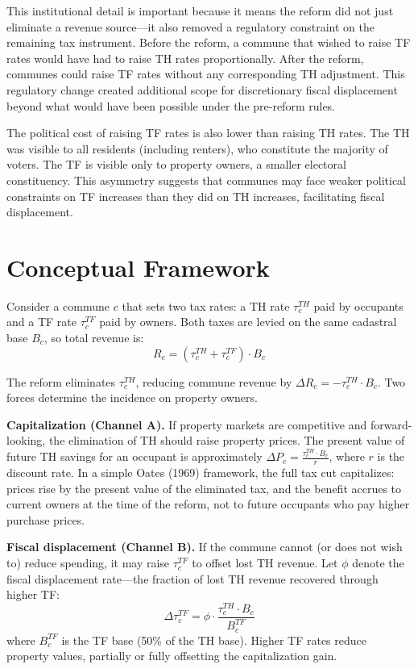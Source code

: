 \documentclass[12pt]{article}
\begin{document}
This institutional detail is important because it means the reform did not just eliminate a revenue source---it also removed a regulatory constraint on the remaining tax instrument. Before the reform, a commune that wished to raise TF rates would have had to raise TH rates proportionally. After the reform, communes could raise TF rates without any corresponding TH adjustment. This regulatory change created additional scope for discretionary fiscal displacement beyond what would have been possible under the pre-reform rules.

The political cost of raising TF rates is also lower than raising TH rates. The TH was visible to all residents (including renters), who constitute the majority of voters. The TF is visible only to property owners, a smaller electoral constituency. This asymmetry suggests that communes may face weaker political constraints on TF increases than they did on TH increases, facilitating fiscal displacement.


\section{Conceptual Framework}

Consider a commune $c$ that sets two tax rates: a TH rate $\tau^{TH}_c$ paid by occupants and a TF rate $\tau^{TF}_c$ paid by owners. Both taxes are levied on the same cadastral base $B_c$, so total revenue is:
\begin{equation}
R_c = (\tau^{TH}_c + \tau^{TF}_c) \cdot B_c
\end{equation}

The reform eliminates $\tau^{TH}_c$, reducing commune revenue by $\Delta R_c = -\tau^{TH}_c \cdot B_c$. Two forces determine the incidence on property owners.

\textbf{Capitalization (Channel A).} If property markets are competitive and forward-looking, the elimination of TH should raise property prices. The present value of future TH savings for an occupant is approximately $\Delta P_c = \frac{\tau^{TH}_c \cdot B_c}{r}$, where $r$ is the discount rate. In a simple Oates (1969) framework, the full tax cut capitalizes: prices rise by the present value of the eliminated tax, and the benefit accrues to current owners at the time of the reform, not to future occupants who pay higher purchase prices.

\textbf{Fiscal displacement (Channel B).} If the commune cannot (or does not wish to) reduce spending, it may raise $\tau^{TF}_c$ to offset lost TH revenue. Let $\phi$ denote the fiscal displacement rate---the fraction of lost TH revenue recovered through higher TF:
\begin{equation}
\Delta \tau^{TF}_c = \phi \cdot \frac{\tau^{TH}_c \cdot B_c}{B^{TF}_c}
\end{equation}
where $B^{TF}_c$ is the TF base (50\% of the TH base). Higher TF rates reduce property values, partially or fully offsetting the capitalization gain.
\end{document}
